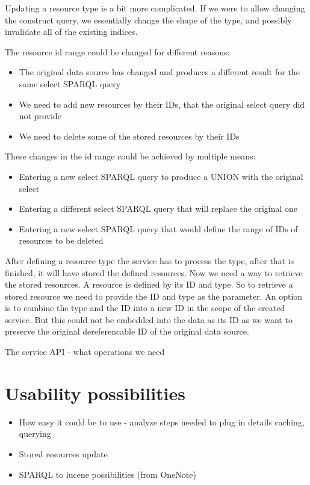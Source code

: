 Updating a resource type is a bit more complicated. If we were to allow changing the construct query, we essentially change the shape of the type, and possibly invalidate all of the existing indices. 

The resource id range could be changed for different reasons:
\begin{itemize}
	\item The original data source has changed and produces a different result for the same select SPARQL query
	\item We need to add new resources by their IDs, that the original select query did not provide
	\item We need to delete some of the stored resources by their IDs
\end{itemize}
These changes in the id range could be achieved by multiple means: 
\begin{itemize}
	\item Entering a new select SPARQL query to produce a UNION with the original select
	\item Entering a different select SPARQL query that will replace the original one
	\item Entering a new select SPARQL query that would define the range of IDs of resources to be deleted
\end{itemize}

After defining a resource type the service has to process the type, after that is finished, it will have stored the defined resources. Now we need a way to retrieve the stored resources. A resource is defined by its ID and type. So to retrieve a stored resource we need to provide the ID and type as the parameter.
An option is to combine the type and the ID into a new ID in the scope of the created service. But this could not be embedded into the data as its ID as we want to preserve the original dereferencable ID of the original data source.



The service API - what operations we need

\section{Usability possibilities}
\begin{itemize}
	\item How easy it could be to use - analyze steps needed to plug in details caching, querying
	\item Stored resources update
	\item SPARQL to lucene possibilities (from OneNote)
\end{itemize}


